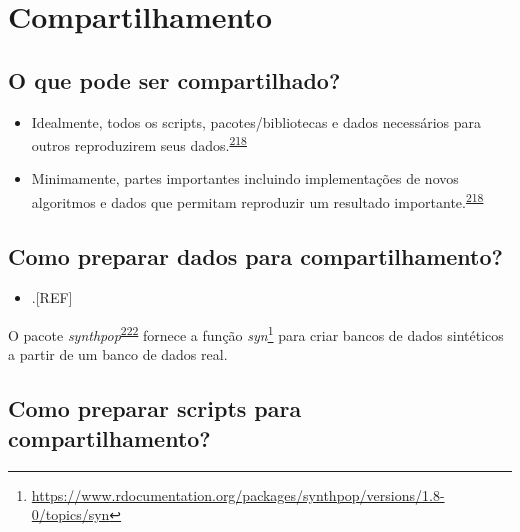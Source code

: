 \documentclass[
  a4paper,
]{book}
\providecommand{\tightlist}{%
  \setlength{\itemsep}{0pt}\setlength{\parskip}{0pt}}
\renewcommand{\href}[2]{#2\footnote{\url{#1}}}
\newenvironment{infobox}[1]
  {
  \begin{itemize}
  \renewcommand{\labelitemi}{
    \raisebox{-.7\height}[0pt][0pt]{
      {\setkeys{Gin}{width=3em,keepaspectratio}
        \texttt{[image: \#1]}}
    }
  }
  \setlength{\fboxsep}{1em}
  \begin{blackbox}
  \item
  }
  {
  \end{blackbox}
  \end{itemize}
  }
\begin{document}
\hypertarget{compartilhamento}{%
\section{Compartilhamento}\label{compartilhamento}}

\hypertarget{o-que-pode-ser-compartilhado}{%
\subsection{O que pode ser compartilhado?}\label{o-que-pode-ser-compartilhado}}

\begin{itemize}
\item
  Idealmente, todos os scripts, pacotes/bibliotecas e dados necessários para outros reproduzirem seus dados.\textsuperscript{\protect\hyperlink{ref-Eglen2017}{218}}
\item
  Minimamente, partes importantes incluindo implementações de novos algoritmos e dados que permitam reproduzir um resultado importante.\textsuperscript{\protect\hyperlink{ref-Eglen2017}{218}}
\end{itemize}

\hypertarget{como-preparar-dados-para-compartilhamento}{%
\subsection{Como preparar dados para compartilhamento?}\label{como-preparar-dados-para-compartilhamento}}

\begin{itemize}
\tightlist
\item
  .{[}REF{]}
\end{itemize}

\begin{infobox}{images/Rlogo}
O pacote \emph{synthpop}\textsuperscript{\protect\hyperlink{ref-synthpop}{222}} fornece a função \href{https://www.rdocumentation.org/packages/synthpop/versions/1.8-0/topics/syn}{\emph{syn}} para criar bancos de dados sintéticos a partir de um banco de dados real.

\end{infobox}

\hypertarget{como-preparar-scripts-para-compartilhamento}{%
\subsection{Como preparar scripts para compartilhamento?}\label{como-preparar-scripts-para-compartilhamento}}
\end{document}

